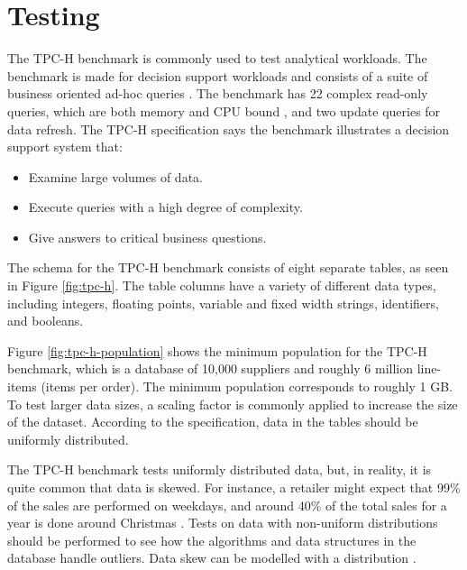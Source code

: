 \section{Testing}
\label{sec:Testing}
The TPC-H benchmark is commonly used to test analytical workloads. The benchmark is made for decision support workloads and consists of a suite of business oriented ad-hoc queries \cite{Transaction_Processing_Performance_Council_TPC2014-ux}. The benchmark has 22 complex read-only queries, which are both memory and CPU bound \cite{Boncz2005-wj}, and two update queries for data refresh. The TPC-H specification says the benchmark illustrates a decision support system that:
\begin{itemize}
  \item Examine large volumes of data.
  \item Execute queries with a high degree of complexity.
  \item Give answers to critical business questions.
\end{itemize}

The schema for the TPC-H benchmark consists of eight separate tables, as seen in Figure \ref{fig:tpc-h}. The table columns have a variety of different data types, including integers, floating points, variable and fixed width strings, identifiers, and booleans. 

Figure \ref{fig:tpc-h-population} shows the minimum population for the TPC-H benchmark, which is a database of 10,000 suppliers and roughly 6 million line-items (items per order). The minimum population corresponds to roughly 1 GB. To test larger data sizes, a scaling factor is commonly applied to increase the size of the dataset. According to the specification, data in the tables should be uniformly distributed.

The TPC-H benchmark tests uniformly distributed data, but, in reality, it is quite common that data is skewed. For instance, a retailer might expect that 99\% of the sales are performed on weekdays, and around 40\% of the total sales for a year is done around Christmas \cite{Raman2008-gi}. Tests on data with non-uniform distributions should be performed to see how the algorithms and data structures in the database handle outliers. Data skew can be modelled with a  distribution \cite{Holloway2008-rr}. 


